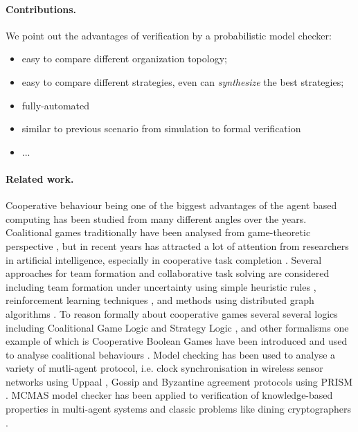 \documentclass{llncs}
\begin{document}
\paragraph{Contributions.}

We point out the advantages of verification by a probabilistic model checker:

\begin{itemize}
  \item easy to compare different organization topology;

  \item easy to compare different strategies, even can \emph{synthesize} the best strategies;

  \item fully-automated

  \item similar to previous scenario from simulation to formal verification

  \item ...
\end{itemize}

\paragraph{Related work.}

Cooperative behaviour being one of the biggest advantages of the agent based computing has been studied from many different angles over the years. Coalitional games traditionally have been analysed from game-theoretic perspective \cite{osborne1994course}, but in recent years has attracted a lot of attention from researchers in artificial intelligence, especially in cooperative task completion \cite{shehory1998methods}. Several approaches for team formation and collaborative task solving are considered including team formation under uncertainty using simple heuristic rules \cite{kraus2003coalition}, reinforcement learning techniques \cite{abdallah2004organization}, and methods using distributed graph algorithms \cite{manisterski2006forming}. To reason formally about cooperative games several several logics  including Coalitional Game Logic \cite{agotnes2009reasoning} and Strategy Logic \cite{chatterjee2007strategy}, and other formalisms one example of which is Cooperative Boolean Games \cite{dunne2008cooperative} have been introduced and used to analyse coalitional behaviours \cite{bonzon2007efficient}. Model checking has been used to analyse a variety of mutli-agent protocol, i.e. clock synchronisation in wireless sensor networks using Uppaal \cite{heidarian2009analysis}, Gossip  \cite{KNP08d} and Byzantine agreement protocols  \cite{KN02} using PRISM   \cite{KNP11}. MCMAS model checker has been applied to verification of knowledge-based properties in multi-agent systems and classic problems like dining cryptographers \cite{lomuscio2006mcmas}.   
\end{document}
